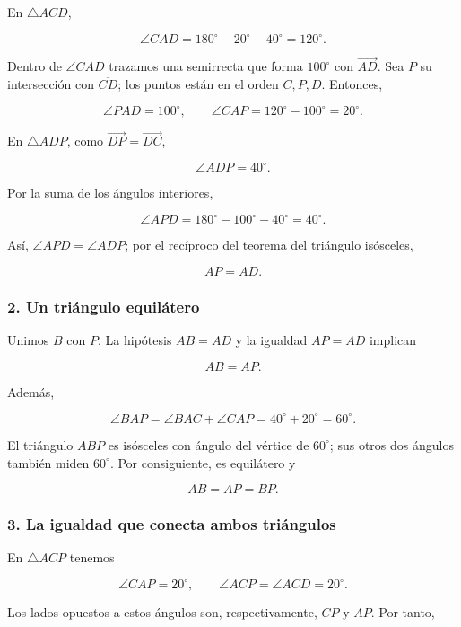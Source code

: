 \documentclass[a4paper,11pt]{article}
\begin{document}
En \(\triangle ACD\),

\[\angle CAD=180^\circ-20^\circ-40^\circ=120^\circ.\]

Dentro de \(\angle CAD\) trazamos una semirrecta que forma \(100^\circ\)
con \(\overrightarrow{AD}\). Sea \(P\) su intersección con
\(\overline{CD}\); los puntos están en el orden \(C,P,D\). Entonces,

\[\angle PAD=100^\circ,\qquad \angle CAP=120^\circ-100^\circ=20^\circ.\]

En \(\triangle ADP\), como \(\overrightarrow{DP}=\overrightarrow{DC}\),

\[\angle ADP=40^\circ.\]

Por la suma de los ángulos interiores,

\[\angle APD=180^\circ-100^\circ-40^\circ=40^\circ.\]

Así, \(\angle APD=\angle ADP\); por el recíproco del teorema del
triángulo isósceles,

\[AP=AD.\]

\hypertarget{un-triuxe1ngulo-equiluxe1tero-1}{%
\subsubsection*{2. Un triángulo
equilátero}\label{un-triuxe1ngulo-equiluxe1tero-1}}

Unimos \(B\) con \(P\). La hipótesis \(AB=AD\) y la igualdad \(AP=AD\)
implican

\[AB=AP.\]

Además,

\[\angle BAP=\angle BAC+\angle CAP=40^\circ+20^\circ=60^\circ.\]

El triángulo \(ABP\) es isósceles con ángulo del vértice de
\(60^\circ\); sus otros dos ángulos también miden \(60^\circ\). Por
consiguiente, es equilátero y

\[AB=AP=BP.\]

\hypertarget{la-igualdad-que-conecta-ambos-triuxe1ngulos}{%
\subsubsection*{3. La igualdad que conecta ambos
triángulos}\label{la-igualdad-que-conecta-ambos-triuxe1ngulos}}

En \(\triangle ACP\) tenemos

\[\angle CAP=20^\circ,\qquad \angle ACP=\angle ACD=20^\circ.\]

Los lados opuestos a estos ángulos son, respectivamente, \(CP\) y
\(AP\). Por tanto,
\end{document}
